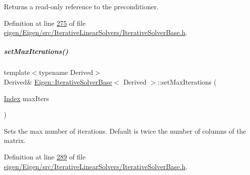\begin{DoxyReturn}{Returns}
a read-\/only reference to the preconditioner. 
\end{DoxyReturn}


Definition at line \hyperlink{eigen_2_eigen_2src_2_iterative_linear_solvers_2_iterative_solver_base_8h_source_l00275}{275} of file \hyperlink{eigen_2_eigen_2src_2_iterative_linear_solvers_2_iterative_solver_base_8h_source}{eigen/\+Eigen/src/\+Iterative\+Linear\+Solvers/\+Iterative\+Solver\+Base.\+h}.

\mbox{\label{group___iterative_linear_solvers___module_af83de7a7d31d9d4bd1fef6222b07335b}} 
\subparagraph{\texorpdfstring{set\+Max\+Iterations()}{setMaxIterations()}\hspace{0.1cm}{\footnotesize\ttfamily [1/2]}}
{\footnotesize\ttfamily template$<$typename Derived$>$ \\
Derived\& \hyperlink{group___iterative_linear_solvers___module_class_eigen_1_1_iterative_solver_base}{Eigen\+::\+Iterative\+Solver\+Base}$<$ Derived $>$\+::set\+Max\+Iterations (\begin{DoxyParamCaption}\item[{\hyperlink{namespace_eigen_a62e77e0933482dafde8fe197d9a2cfde}{Index}}]{max\+Iters }\end{DoxyParamCaption})\hspace{0.3cm}{\ttfamily [inline]}}

Sets the max number of iterations. Default is twice the number of columns of the matrix. 

Definition at line \hyperlink{eigen_2_eigen_2src_2_iterative_linear_solvers_2_iterative_solver_base_8h_source_l00289}{289} of file \hyperlink{eigen_2_eigen_2src_2_iterative_linear_solvers_2_iterative_solver_base_8h_source}{eigen/\+Eigen/src/\+Iterative\+Linear\+Solvers/\+Iterative\+Solver\+Base.\+h}.

